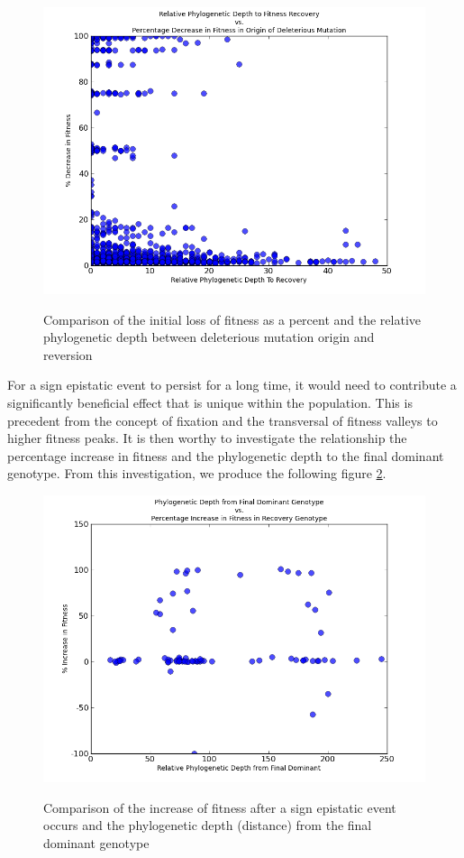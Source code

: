 \documentclass[a4paper, 10pt]{article}
\begin{document}
\begin{figure}[h]
    \centering
    \includegraphics[scale=0.6]{initFitLoss_vs_depthRecover.png}
    \label{fitLoss}
    \caption{Comparison of the initial loss of fitness as a percent and the relative phylogenetic depth between deleterious mutation origin and reversion}
\end{figure}

For a sign epistatic event to persist for a long time, it would need to contribute a significantly beneficial effect that is unique within the population. This is precedent from the concept of fixation and the transversal of fitness valleys to higher fitness peaks. It is then worthy to investigate the relationship the percentage increase in fitness and the phylogenetic depth to the final dominant genotype. From this investigation, we produce the following figure \ref{inFD}.

\begin{figure}[h]
    \centering
    \includegraphics[scale=0.6]{fitnessInc_vs_FDDepth.png}
    \label{inFD}
    \caption{Comparison of the increase of fitness after a sign epistatic event occurs and the phylogenetic depth (distance) from the final dominant genotype}
\end{figure}
\end{document}
